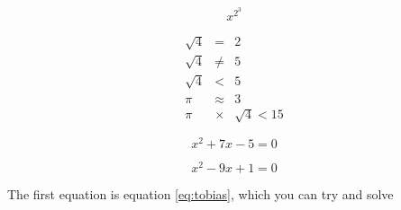 \documentclass{article}
\begin{document}
$$x^{2^3}$$


\begin{eqnarray*}
    \sqrt{4} &=& 2 \\
    \sqrt{4} &\neq& 5 \\ 
    \sqrt{4} &<& 5 \\
    \pi &\approx& 3 \\
    \pi &\times& \sqrt{4} < 15
\end{eqnarray*}

\begin{equation} \label{eq:tobias}
x^2 + 7x - 5 = 0
\end{equation}

\begin{equation}\label{eq:second}
x^2 - 9x + 1 = 0
\end{equation}

The first equation is equation \ref{eq:tobias}, which you can try and solve
\end{document}

